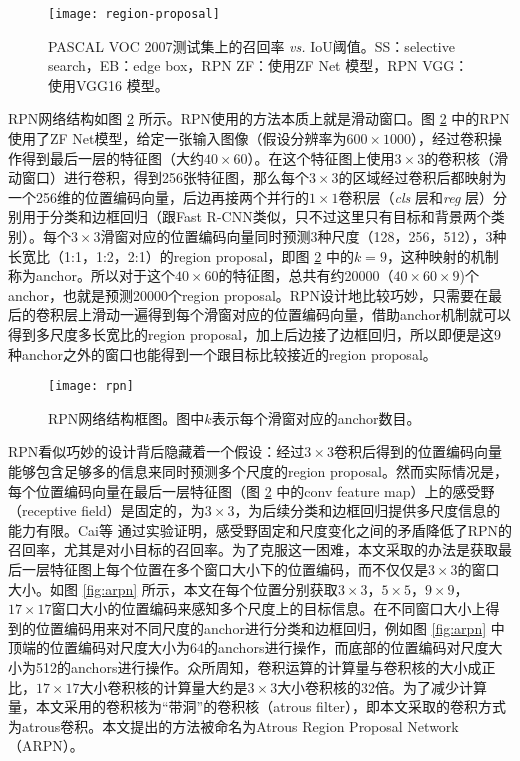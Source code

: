 \begin{figure}[h]
	\centering
	\texttt{[image: region-proposal]}
	\caption{PASCAL VOC 2007测试集上的召回率 \textit{vs.} IoU阈值。SS：selective search，EB：edge box，RPN ZF：使用ZF Net \cite{zfnet} 模型，RPN VGG：使用VGG16 \cite{vgg} 模型。}
	\label{fig:region-proposal}
\end{figure}

RPN网络结构如图 \ref{fig:rpn} 所示。RPN使用的方法本质上就是滑动窗口。图 \ref{fig:rpn} 中的RPN使用了ZF Net模型，给定一张输入图像（假设分辨率为$600\times1000$），经过卷积操作得到最后一层的特征图（大约$40\times60$）。在这个特征图上使用$3\times3$的卷积核（滑动窗口）进行卷积，得到256张特征图，那么每个$3\times3$的区域经过卷积后都映射为一个256维的位置编码向量，后边再接两个并行的$1\times1$卷积层（\emph{cls} 层和\emph{reg} 层）分别用于分类和边框回归（跟Fast R-CNN类似，只不过这里只有目标和背景两个类别）。每个$3\times3$滑窗对应的位置编码向量同时预测3种尺度（128，256，512），3种长宽比（1:1，1:2，2:1）的region proposal，即图 \ref{fig:rpn} 中的$k=9$，这种映射的机制称为anchor。所以对于这个$40\times60$的特征图，总共有约20000（$40\times60\times9$)个anchor，也就是预测20000个region proposal。RPN设计地比较巧妙，只需要在最后的卷积层上滑动一遍得到每个滑窗对应的位置编码向量，借助anchor机制就可以得到多尺度多长宽比的region proposal，加上后边接了边框回归，所以即便是这9种anchor之外的窗口也能得到一个跟目标比较接近的region proposal。

\begin{figure}[h]
	\centering
	\texttt{[image: rpn]}
	\caption{RPN网络结构框图。图中$k$表示每个滑窗对应的anchor数目。}
	\label{fig:rpn}
\end{figure}

RPN看似巧妙的设计背后隐藏着一个假设：经过$3\times3$卷积后得到的位置编码向量能够包含足够多的信息来同时预测多个尺度的region proposal。然而实际情况是，每个位置编码向量在最后一层特征图（图 \ref{fig:rpn} 中的conv feature map）上的感受野（receptive field）是固定的，为$3\times3$，为后续分类和边框回归提供多尺度信息的能力有限。Cai等 \cite{mscnn} 通过实验证明，感受野固定和尺度变化之间的矛盾降低了RPN的召回率，尤其是对小目标的召回率。为了克服这一困难，本文采取的办法是获取最后一层特征图上每个位置在多个窗口大小下的位置编码，而不仅仅是$3\times3$的窗口大小。如图 \ref{fig:arpn} 所示，本文在每个位置分别获取$3\times3$，$5\times5$，$9\times9$，$17\times17$窗口大小的位置编码来感知多个尺度上的目标信息。在不同窗口大小上得到的位置编码用来对不同尺度的anchor进行分类和边框回归，例如图 \ref{fig:arpn} 中顶端的位置编码对尺度大小为64的anchors进行操作，而底部的位置编码对尺度大小为512的anchors进行操作。众所周知，卷积运算的计算量与卷积核的大小成正比，$17\times17$大小卷积核的计算量大约是$3\times3$大小卷积核的32倍。为了减少计算量，本文采用的卷积核为``带洞''的卷积核（atrous filter），即本文采取的卷积方式为atrous卷积。本文提出的方法被命名为Atrous Region Proposal Network（ARPN）。

